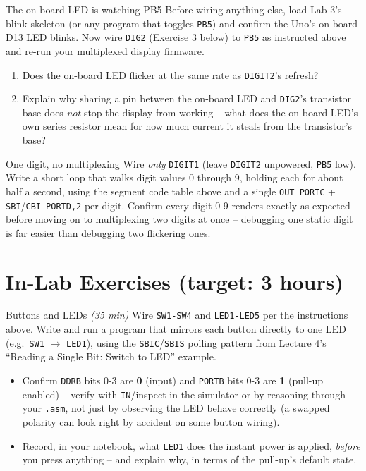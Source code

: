\documentclass[11pt]{article}
\begin{document}
\begin{tryit}{The on-board LED is watching PB5}
Before wiring anything else, load Lab 3's blink skeleton (or any program that
toggles \texttt{PB5}) and confirm the Uno's on-board D13 LED blinks. Now wire
\texttt{DIG2} (Exercise 3 below) to \texttt{PB5} as instructed above and re-run your
multiplexed display firmware.
\begin{enumerate}[nosep,leftmargin=*]
  \item Does the on-board LED flicker at the same rate as \texttt{DIGIT2}'s refresh?
  \item Explain why sharing a pin between the on-board LED and \texttt{DIG2}'s
        transistor base does \emph{not} stop the display from working -- what does
        the on-board LED's own series resistor mean for how much current it steals
        from the transistor's base?
\end{enumerate}
\end{tryit}

\begin{tryit}{One digit, no multiplexing}
Wire \emph{only} \texttt{DIGIT1} (leave \texttt{DIGIT2} unpowered, \texttt{PB5} low).
Write a short loop that walks digit values 0 through 9, holding each for about half a
second, using the segment code table above and a single \texttt{OUT PORTC} +
\texttt{SBI}/\texttt{CBI PORTD,2} per digit. Confirm every digit 0-9 renders exactly
as expected before moving on to multiplexing two digits at once -- debugging one
static digit is far easier than debugging two flickering ones.
\end{tryit}

\section*{In-Lab Exercises (target: 3 hours)}

\begin{labexercise}{Buttons and LEDs \hfill {\small \itshape (35 min)}}
Wire \texttt{SW1-SW4} and \texttt{LED1-LED5} per the instructions above. Write and
run a program that mirrors each button directly to one LED (e.g.\ \texttt{SW1}
$\to$ \texttt{LED1}), using the \texttt{SBIC}/\texttt{SBIS} polling pattern from
Lecture 4's ``Reading a Single Bit: Switch to LED'' example.
\begin{itemize}[nosep,leftmargin=*]
  \item Confirm \texttt{DDRB} bits 0-3 are \textbf{0} (input) and \texttt{PORTB}
        bits 0-3 are \textbf{1} (pull-up enabled) -- verify with \texttt{IN}/inspect
        in the simulator or by reasoning through your \texttt{.asm}, not just by
        observing the LED behave correctly (a swapped polarity can look right by
        accident on some button wiring).
  \item Record, in your notebook, what \texttt{LED1} does the instant power is
        applied, \emph{before} you press anything -- and explain why, in terms of
        the pull-up's default state.
\end{itemize}
\end{labexercise}
\end{document}
